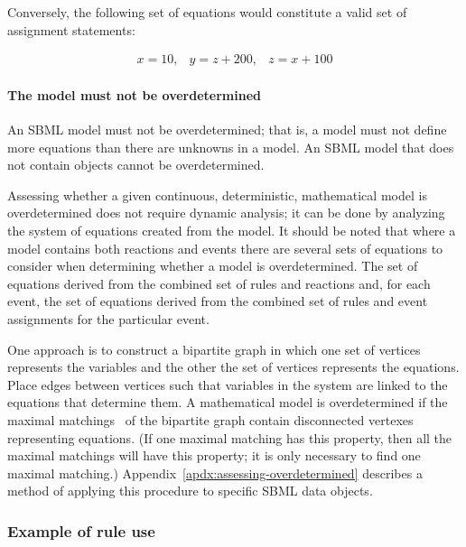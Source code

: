 Conversely, the following set of equations would constitute a
valid set of assignment statements:
\begin{linenomath}
\begin{equation*}
  \begin{array}{lll}
    x = 10, & y = z + 200, & z = x + 100
  \end{array}
\end{equation*}
\end{linenomath}


\paragraph{The model must not be overdetermined}

An SBML model must not be overdetermined; that is, a model must
not define more equations than there are unknowns in a model.  An
SBML model that does not contain \AlgebraicRule objects cannot
be overdetermined.

Assessing whether a given continuous, deterministic, mathematical
model is overdetermined does not require dynamic analysis; it can
be done by analyzing the system of equations created from the
model.  It should be noted that where a model contains both
reactions and events there are several sets of equations to
consider when determining whether a model is overdetermined.  The
set of equations derived from the combined set of rules and 
reactions and, for each event, the set of equations derived from
the combined set of rules and event assignments for the particular
event. 

One approach is to construct a bipartite graph in which
one set of vertices represents the variables and the other the set
of vertices represents the equations.  Place edges between
vertices such that variables in the system are linked to the
equations that determine them.  A mathematical model is 
overdetermined if the maximal matchings~\citep{chartrand_1977} 
of the bipartite graph contain disconnected vertexes representing 
equations.  (If one maximal matching has this property, then all the maximal matchings will
have this property; \ie it is only necessary to find one maximal
matching.)  Appendix~\ref{apdx:assessing-overdetermined} describes
a method of applying this procedure to specific SBML data objects.


\subsubsection{Example of rule use}
\label{sec:eg-rule-use}

